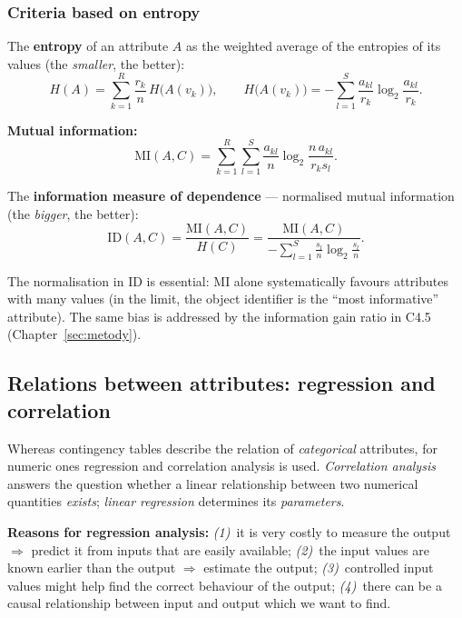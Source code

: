 \documentclass[11pt,a4paper]{article}
\theoremstyle{definition}
\providecommand{\uv}[1]{``#1''}
\begin{document}
\subsubsection{Criteria based on entropy}

\begin{defbox}
The \textbf{entropy} of an attribute $A$ as the weighted average of the entropies of its values
(the \emph{smaller}, the better):
\[ H(A)=\sum_{k=1}^{R}\frac{r_k}{n}\,H\big(A(v_k)\big),\qquad
   H\big(A(v_k)\big)=-\sum_{l=1}^{S}\frac{a_{kl}}{r_k}\log_2\frac{a_{kl}}{r_k}. \]

\textbf{Mutual information:}
\[ \mathrm{MI}(A,C)=\sum_{k=1}^{R}\sum_{l=1}^{S}\frac{a_{kl}}{n}
   \log_2\frac{n\,a_{kl}}{r_k s_l}. \]

The \textbf{information measure of dependence} --- normalised mutual information (the
\emph{bigger}, the better):
\[ \mathrm{ID}(A,C)=\frac{\mathrm{MI}(A,C)}{H(C)}
   =\frac{\mathrm{MI}(A,C)}{-\sum_{l=1}^{S}\frac{s_l}{n}\log_2\frac{s_l}{n}}. \]
\end{defbox}

The normalisation in $\mathrm{ID}$ is essential: $\mathrm{MI}$ alone systematically favours
attributes with many values (in the limit, the object identifier is the \uv{most informative}
attribute). The same bias is addressed by the information gain ratio in C4.5
(Chapter~\ref{sec:metody}).

\subsection{Relations between attributes: regression and correlation}

Whereas contingency tables describe the relation of \emph{categorical} attributes, for numeric
ones regression and correlation analysis is used. \emph{Correlation analysis} answers the
question whether a linear relationship between two numerical quantities \emph{exists};
\emph{linear regression} determines its \emph{parameters}.

\textbf{Reasons for regression analysis:} \emph{(1)}~it is very costly to measure the output
$\Rightarrow$ predict it from inputs that are easily available; \emph{(2)}~the input values are
known earlier than the output $\Rightarrow$ estimate the output; \emph{(3)}~controlled input
values might help find the correct behaviour of the output; \emph{(4)}~there can be a causal
relationship between input and output which we want to find.
\end{document}
